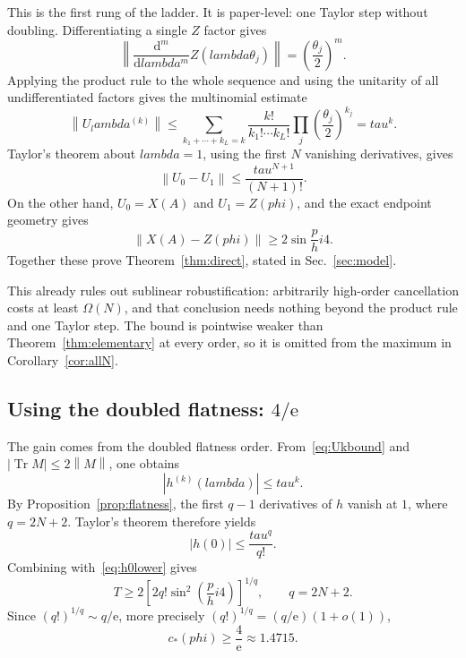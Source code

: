 \documentclass[%
  aps,
  pra,
  preprint,
  superscriptaddress,
  amsmath,amssymb,
  nofootinbib,
  floatfix,
]{revtex4-2}
\def\lambda{lambda}\def\tau{tau}\def\phi{phi}\def\alpha{alpha}%
\theoremstyle{definition}
\theoremstyle{remark}
\newcommand{\Tr}{\operatorname{Tr}}
\newcommand{\norm}[1]{\left\lVert #1\right\rVert}
\newcommand{\tauvar}{\tau}
\newcommand{\cstar}{c_*}
\begin{document}
This is the first rung of the ladder. It is paper-level: one Taylor step
without doubling. Differentiating a single $Z$ factor gives
\[
\norm{\frac{\mathrm{d}^m}{\mathrm{d}\lambda^m}Z(\lambda\theta_j)}
=\left(\frac{\theta_j}{2}\right)^m.
\]
Applying the product rule to the whole sequence and using the unitarity of all undifferentiated
factors gives the multinomial estimate
\begin{equation}
\norm{U_\lambda^{(k)}}
\le
\sum_{k_1+\cdots+k_L=k}
\frac{k!}{k_1!\cdots k_L!}
\prod_j\left(\frac{\theta_j}{2}\right)^{k_j}
=\tauvar^k.
\label{eq:Ukbound}
\end{equation}
Taylor's theorem about $\lambda=1$, using the first $N$ vanishing derivatives, gives
\begin{equation}
\norm{U_0-U_1}
\le\frac{\tauvar^{N+1}}{(N+1)!}.
\label{eq:taylorU}
\end{equation}
On the other hand, $U_0=X(A)$ and $U_1=Z(\phi)$, and the exact endpoint geometry gives
\begin{equation}
\norm{X(A)-Z(\phi)}
\ge2\sin\frac\phi4.
\end{equation}
Together these prove Theorem~\ref{thm:direct}, stated in Sec.~\ref{sec:model}.

This already rules out sublinear robustification: arbitrarily high-order cancellation costs at
least $\Omega(N)$, and that conclusion needs nothing beyond the product rule and one Taylor
step. The bound is pointwise weaker than Theorem~\ref{thm:elementary} at every order, so it is
omitted from the maximum in Corollary~\ref{cor:allN}.

\subsection{Using the doubled flatness: \texorpdfstring{$4/\mathrm{e}$}{4/e}}
\label{sec:doubled}

The gain comes from the doubled flatness order. From~\eqref{eq:Ukbound} and
$|\Tr M|\le2\norm M$, one obtains
\begin{equation}
|h^{(k)}(\lambda)|\le\tauvar^k.
\label{eq:hkbound}
\end{equation}
By Proposition~\ref{prop:flatness}, the first $q-1$ derivatives of $h$ vanish at $1$, where
$q=2N+2$. Taylor's theorem therefore yields
\begin{equation}
|h(0)|\le\frac{\tauvar^q}{q!}.
\label{eq:taylorh}
\end{equation}
Combining with~\eqref{eq:h0lower} gives
\begin{equation}
\displaystyle
T\ge
2\left[2q!\sin^2\left(\frac\phi4\right)\right]^{1/q},
\qquad q=2N+2.
\label{eq:4e-finite}
\end{equation}
Since $(q!)^{1/q}\sim q/\mathrm{e}$, more precisely $(q!)^{1/q}=(q/\mathrm{e})(1+o(1))$,
\begin{equation}
\cstar(\phi)\ge\frac{4}{\mathrm{e}}\approx1.4715.
\label{eq:4e}
\end{equation}
\end{document}
